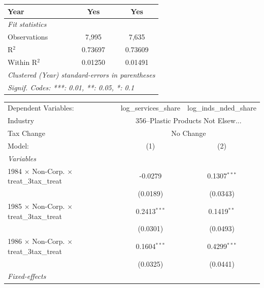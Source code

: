 \documentclass[
  12pt]{article}
\theoremstyle{definition}
\theoremstyle{remark}
\begin{document}
\begin{table}
\begin{minipage}{\linewidth}
\begin{tabular}{lcc}
   Year                                                    & Yes                    & Yes\\  
   \midrule
   \emph{Fit statistics}\\
   Observations                                            & 7,995                  & 7,635\\  
   R$^2$                                                   & 0.73697                & 0.73609\\  
   Within R$^2$                                            & 0.01250                & 0.01491\\  
   \midrule \midrule
   \multicolumn{3}{l}{\emph{Clustered (Year) standard-errors in parentheses}}\\
   \multicolumn{3}{l}{\emph{Signif. Codes: ***: 0.01, **: 0.05, *: 0.1}}\\
\end{tabular}
\par\endgroup
\begingroup
\centering
\begin{tabular}{lcc}
   \tabularnewline \midrule \midrule
   Dependent Variables:                                    & log\_services\_share   & log\_inds\_nded\_share\\     
   Industry & \multicolumn{2}{c}{356–Plastic Products Not Elsew...} \\ 
   Tax Change & \multicolumn{2}{c}{No Change} \\ 
   Model:                                                  & (1)                    & (2)\\  
   \midrule
   \emph{Variables}\\
   1984 $\times$ Non-Corp. $\times$ treat\_3tax\_treat     & -0.0279                & 0.1307$^{***}$\\   
                                                           & (0.0189)               & (0.0343)\\   
   1985 $\times$ Non-Corp. $\times$ treat\_3tax\_treat     & 0.2413$^{***}$         & 0.1419$^{**}$\\   
                                                           & (0.0301)               & (0.0493)\\   
   1986 $\times$ Non-Corp. $\times$ treat\_3tax\_treat     & 0.1604$^{***}$         & 0.4299$^{***}$\\   
                                                           & (0.0325)               & (0.0441)\\   
   \midrule
   \emph{Fixed-effects}\\

\end{tabular}
\end{minipage}
\end{table}
\end{document}
